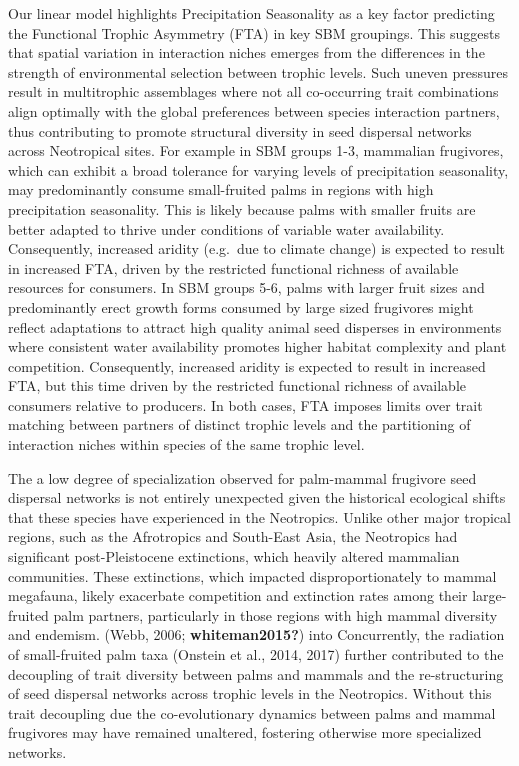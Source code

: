 \documentclass[
]{agujournal2019}
\begin{document}
Our linear model highlights Precipitation Seasonality as a key factor
predicting the Functional Trophic Asymmetry (FTA) in key SBM groupings.
This suggests that spatial variation in interaction niches emerges from
the differences in the strength of environmental selection between
trophic levels. Such uneven pressures result in multitrophic assemblages
where not all co-occurring trait combinations align optimally with the
global preferences between species interaction partners, thus
contributing to promote structural diversity in seed dispersal networks
across Neotropical sites. For example in SBM groups 1-3, mammalian
frugivores, which can exhibit a broad tolerance for varying levels of
precipitation seasonality, may predominantly consume small-fruited palms
in regions with high precipitation seasonality. This is likely because
palms with smaller fruits are better adapted to thrive under conditions
of variable water availability. Consequently, increased aridity
(e.g.~due to climate change) is expected to result in increased FTA,
driven by the restricted functional richness of available resources for
consumers. In SBM groups 5-6, palms with larger fruit sizes and
predominantly erect growth forms consumed by large sized frugivores
might reflect adaptations to attract high quality animal seed disperses
in environments where consistent water availability promotes higher
habitat complexity and plant competition. Consequently, increased
aridity is expected to result in increased FTA, but this time driven by
the restricted functional richness of available consumers relative to
producers. In both cases, FTA imposes limits over trait matching between
partners of distinct trophic levels and the partitioning of interaction
niches within species of the same trophic level.

The a low degree of specialization observed for palm-mammal frugivore
seed dispersal networks is not entirely unexpected given the historical
ecological shifts that these species have experienced in the Neotropics.
Unlike other major tropical regions, such as the Afrotropics and
South-East Asia, the Neotropics had significant post-Pleistocene
extinctions, which heavily altered mammalian communities. These
extinctions, which impacted disproportionately to mammal megafauna,
likely exacerbate competition and extinction rates among their
large-fruited palm partners, particularly in those regions with high
mammal diversity and endemism. (Webb, 2006; \textbf{whiteman2015?}) into
Concurrently, the radiation of small-fruited palm taxa (Onstein et al.,
2014, 2017) further contributed to the decoupling of trait diversity
between palms and mammals and the re-structuring of seed dispersal
networks across trophic levels in the Neotropics. Without this trait
decoupling due the co-evolutionary dynamics between palms and mammal
frugivores may have remained unaltered, fostering otherwise more
specialized networks.
\end{document}
